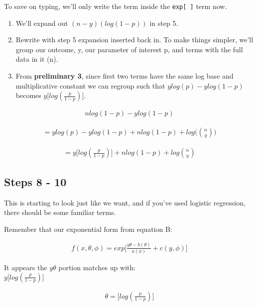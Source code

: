 \documentclass[
]{article}
\begin{document}
To save on typing, we'll only write the term inside the
\texttt{exp{[}\ {]}} term now.

\begin{enumerate}
\def\labelenumi{\arabic{enumi}.}
\setcounter{enumi}{4}
\item
  We'll expand out \((n-y)(log(1-p))\) in step 5.
\item
  Rewrite with step 5 expansion inserted back in. To make things
  simpler, we'll group our outcome, y, our parameter of interest p, and
  terms with the full data in it (n).
\item
  From \textbf{preliminary 3}, since first two terms have the same log
  base and multiplicative constant we can regroup such that
  \(ylog(p) - ylog(1-p)\) becomes \(y\biggl[log(\frac{p}{1-p})\biggr]\).
\end{enumerate}

\begin{align}
\tag{5}
nlog(1-p) - ylog(1-p)
\end{align}

\begin{align}
\tag{6}
=ylog(p) - ylog(1-p) + nlog(1-p) + log\biggl({n\choose y}\biggr)
\end{align}

\begin{align}
\tag{7}
=y\biggl[log(\frac{p}{1-p})\biggr] + nlog(1-p) + log{n\choose y}
\end{align}

\hypertarget{steps-8---10}{%
\subsection{Steps 8 - 10}\label{steps-8---10}}

This is starting to look just like we want, and if you've used logistic
regression, there should be some familiar terms.

Remember that our exponential form from equation B:

\begin{align}
\tag{B}
f(x, \theta, \phi) = exp\biggl[\frac{y\theta-b(\theta)}{a(\phi)} + c(y, \phi)\biggr] 
\end{align}

It appears the \(y\theta\) portion matches up with:\\
\(y\biggl[log(\frac{p}{1-p})\biggr]\)

\begin{align}
\tag{8}
\theta = \biggl[log(\frac{p}{1-p})\biggr]
\end{align}
\end{document}
